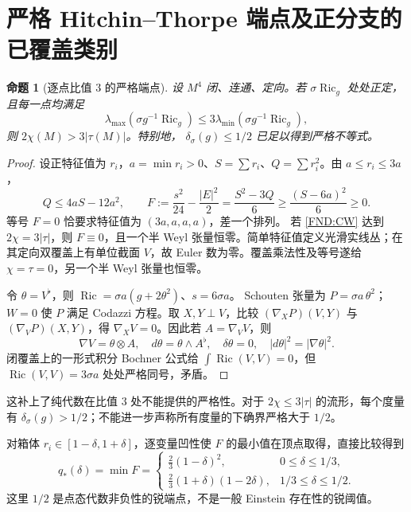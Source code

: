 \documentclass[UTF8,fontset=fandol,zihao=-4,oneside,openany]{ctexbook}
\theoremstyle{cjkplain}
\newtheorem{proposition}[theorem]{命题}
\numberwithin{equation}{chapter}
\DeclareMathOperator{\Ric}{Ric}
\begin{document}
\section{严格 Hitchin--Thorpe 端点及正分支的已覆盖类别}
\begin{proposition}[逐点比值 \(3\) 的严格端点]\label{FND:HT}
设 \(M^4\) 闭、连通、定向。若 \(\sigma\Ric_g\) 处处正定，且每一点均满足
\[
\lambda_{\max}(\sigma g^{-1}\Ric_g)
\le3\lambda_{\min}(\sigma g^{-1}\Ric_g),
\]
则 \(2\chi(M)>3|\tau(M)|\)。特别地，
\(\delta_\sigma(g)\le1/2\) 已足以得到严格不等式。
\end{proposition}
\begin{proof}
设正特征值为 \(r_i\)，\(a=\min r_i>0\)、\(S=\sum r_i\)、\(Q=\sum r_i^2\)。由 \(a\le r_i\le3a\)，
\[
Q\le4aS-12a^2,\qquad
F:=\frac{s^2}{24}-\frac{|E|^2}{2}
=\frac{S^2-3Q}{6}\ge\frac{(S-6a)^2}{6}\ge0.
\]
等号 \(F=0\) 恰要求特征值为 \((3a,a,a,a)\)，差一个排列。
若 \eqref{FND:CW} 达到 \(2\chi=3|\tau|\)，则 \(F\equiv0\)，且一个半 Weyl 张量恒零。简单特征值定义光滑实线丛；在其定向双覆盖上有单位截面 \(V\)，故 Euler 数为零。覆盖乘法性及等号遂给 \(\chi=\tau=0\)，另一个半 Weyl 张量也恒零。

令 \(\theta=V^\flat\)，则
\(\Ric=\sigma a(g+2\theta^2)\)、\(s=6\sigma a\)。
Schouten 张量为 \(P=\sigma a\,\theta^2\)；\(W=0\) 使 \(P\) 满足 Codazzi 方程。取 \(X,Y\perp V\)，比较
\((\nabla_XP)(V,Y)\) 与 \((\nabla_VP)(X,Y)\)，得
\(\nabla_XV=0\)。因此若 \(A=\nabla_VV\)，则
\[
\nabla V=\theta\otimes A,\quad
d\theta=\theta\wedge A^\flat,\quad
\delta\theta=0,\quad |d\theta|^2=|\nabla\theta|^2.
\]
闭覆盖上的一形式积分 Bochner 公式给
\(\int\Ric(V,V)=0\)，但 \(\Ric(V,V)=3\sigma a\) 处处严格同号，矛盾。
\end{proof}
这补上了纯代数在比值 \(3\) 处不能提供的严格性。对于
\(2\chi\le3|\tau|\) 的流形，每个度量有
\(\delta_\sigma(g)>1/2\)；不能进一步声称所有度量的下确界严格大于 \(1/2\)。

对箱体 \(r_i\in[1-\delta,1+\delta]\)，逐变量凹性使 \(F\) 的最小值在顶点取得，直接比较得到
\begin{equation}\label{FND:qstar}
q_*(\delta)=\min F=
\begin{cases}
\frac23(1-\delta)^2,&0\le\delta\le1/3,\\
\frac23(1+\delta)(1-2\delta),&1/3\le\delta\le1/2.
\end{cases}
\end{equation}
这里 \(1/2\) 是点态代数非负性的锐端点，不是一般 Einstein 存在性的锐阈值。
\end{document}
